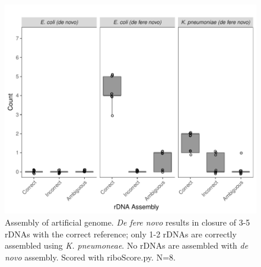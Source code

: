 \documentclass[10pt]{article}
\begin{document}
\begin{figure}[!h]
    \centering
    \hspace*{0cm}\includegraphics[width=.60\textwidth]{simulated_genome.pdf}
    \caption{Assembly of artificial genome. \textit{De fere novo} results in closure of 3-5 rDNAs with the correct reference; only 1-2 rDNAs are correctly assembled using \textit{K. pneumoneae}.  No rDNAs are assembled with \textit{de novo} assembly. Scored with riboScore.py. N=8.}
    \label{fig:simgenome}
\end{figure}
\end{document}
